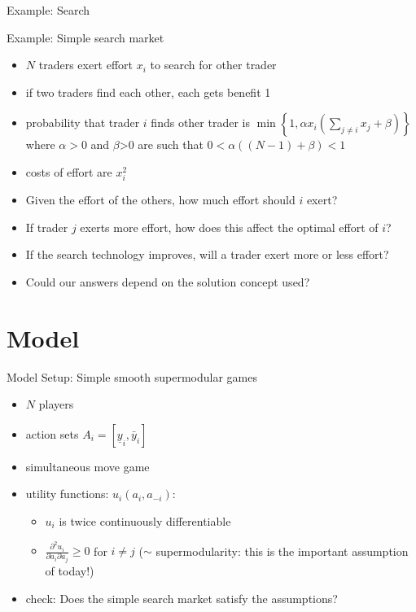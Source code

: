 \documentclass[bigger]{beamer}
\begin{document}
\begin{frame}[label={sec:orgheadline3}]{Example: Search}
\begin{block}{Example: Simple search market}
\begin{itemize}
\item \(N\) traders exert effort \(x_i\) to search for other trader
\item if two traders find each other, each gets benefit 1
\item probability that trader \(i\) finds other trader is \(\min\left\{1,\alpha x_i\left( \sum_{j\neq i}x_j+\beta \right) \right\}\) where \(\alpha>0\) and \(\beta\)>0 are such that \(0<\alpha ((N-1)+\beta)<1\)
\item costs of effort are \(x_i^2\)
\end{itemize}
\end{block}
\begin{itemize}
\item Given the effort of the others, how much effort should \(i\) exert?
\item If trader \(j\) exerts more effort, how does this affect the optimal effort of \(i\)?
\item If the search technology improves, will a trader exert more or less effort?
\item Could our answers depend on the solution concept used?
\end{itemize}
\end{frame}

\section{Model}
\label{sec:orgheadline19}
\begin{frame}[label={sec:orgheadline5}]{Model Setup: Simple smooth supermodular games}
\begin{itemize}
\item \(N\) players
\item action sets \(A_i=[\underline y_i,\bar y_i]\)
\item simultaneous move game
\item utility functions: \(u_i(a_i,a_{-i})\):
\begin{itemize}
\item \(u_i\) is twice continuously differentiable
\item \(\frac{\partial^2 u_i}{\partial a_i\partial a_j}\geq 0\) for \(i\neq j\) (\(\sim\) supermodularity: this is the important assumption of today!)
\end{itemize}
\item check: Does the simple search market satisfy the assumptions?
\end{itemize}
\end{frame}
\end{document}
